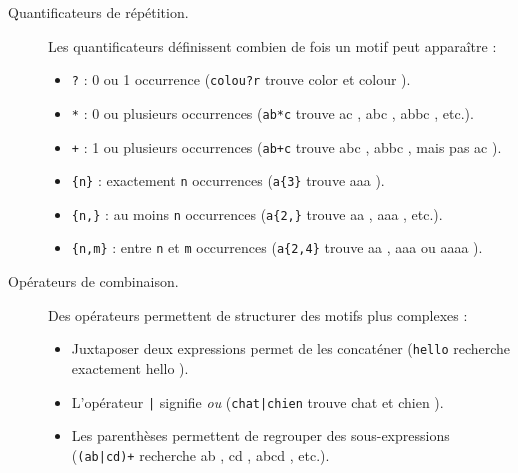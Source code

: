\documentclass{td}
\begin{document}
\begin{description}
  \item[Quantificateurs de répétition.] Les quantificateurs définissent combien de fois un motif peut apparaître :
    \begin{itemize}
    \item \lstinline{?} : 0 ou 1 occurrence (\lstinline{colou?r} trouve \og color \fg{} et \og colour \fg).
    \item \lstinline{*} : 0 ou plusieurs occurrences (\lstinline{ab*c} trouve \og ac \fg, \og abc \fg, \og abbc \fg, etc.).
    \item \lstinline{+} : 1 ou plusieurs occurrences (\lstinline{ab+c} trouve \og abc \fg, \og abbc \fg, mais pas \og ac \fg).
    \item \lstinline|{n}| : exactement \lstinline{n} occurrences (\lstinline|a{3}| trouve \og aaa \fg).
    \item \lstinline|{n,}| : au moins \lstinline{n} occurrences (\lstinline|a{2,}| trouve \og aa \fg, \og aaa \fg, etc.).
    \item \lstinline|{n,m}| : entre \lstinline{n} et \lstinline{m} occurrences (\lstinline|a{2,4}| trouve \og aa \fg, \og aaa \fg{} ou \og aaaa \fg).
    \end{itemize}

  \item[Opérateurs de combinaison.] Des opérateurs permettent de structurer des motifs plus complexes :
    \begin{itemize}
    \item Juxtaposer deux expressions permet de les concaténer (\lstinline{hello} recherche exactement \og hello \fg).
    \item L'opérateur \lstinline{|} signifie \emph{ou} (\lstinline{chat|chien} trouve \og chat \fg{} et \og chien \fg).
    \item Les parenthèses permettent de regrouper des sous-expressions (\lstinline{(ab|cd)+} recherche \og ab \fg, \og cd \fg, \og abcd \fg, etc.).
    \end{itemize}
\end{description}
\end{document}
